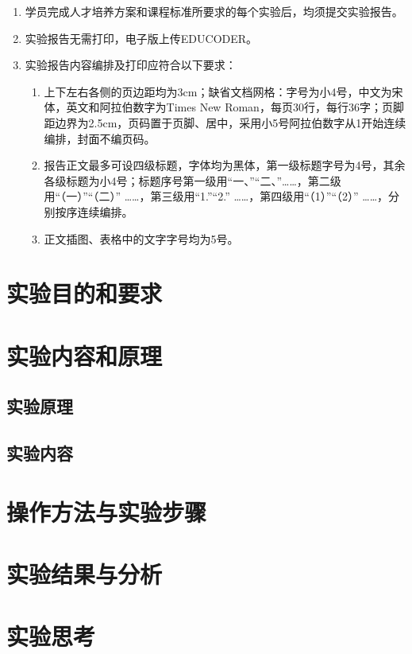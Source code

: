 \documentclass[a4paper,12pt]{article}
\begin{document}
\begin{enumerate}
\songti{}
\item 学员完成人才培养方案和课程标准所要求的每个实验后，均须提交实验报告。
\item 实验报告无需打印，电子版上传EDUCODER。
\item 实验报告内容编排及打印应符合以下要求：
    \begin{enumerate}
    \fangsong{}
    \item 上下左右各侧的页边距均为3cm；缺省文档网格：字号为小4号，中文为宋体，英文和阿拉伯数字为Times New Roman，每页30行，每行36字；页脚距边界为2.5cm，页码置于页脚、居中，采用小5号阿拉伯数字从1开始连续编排，封面不编页码。
    \item 报告正文最多可设四级标题，字体均为黑体，第一级标题字号为4号，其余各级标题为小4号；标题序号第一级用“一、”“二、”……，第二级用“（一）”“（二）” ……，第三级用“1.”“2.” ……，第四级用“（1）”“（2）” ……，分别按序连续编排。
    \item 正文插图、表格中的文字字号均为5号。
    \end{enumerate}
\end{enumerate}

\newpage

\section{实验目的和要求}


\section{实验内容和原理}
\subsection{实验原理}
\subsection{实验内容}



\section{操作方法与实验步骤}


\section{实验结果与分析}


\section{实验思考}
\end{document}
